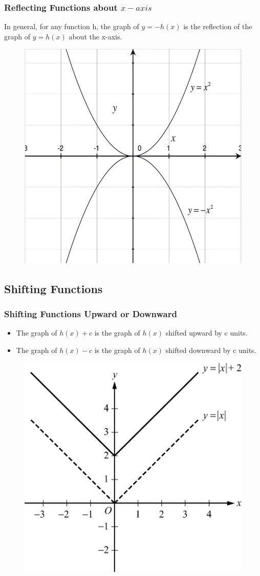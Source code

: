 \documentclass[
	11pt, %
]{beamer}
\begin{document}
\begin{frame}
	\frametitle{Reflecting Functions about $x-axis$}
	\begin{theorem}
	In general, for any function h, the graph of $y = −h(x)$ is the reflection of the graph of $y = h(x)$ about the x-axis.
	\end{theorem}
	\begin{figure}
		\includegraphics[width=0.5\linewidth]{Reflection2.jpeg} 
	\end{figure}
\end{frame}


\subsection{Shifting Functions}
\begin{frame}
	\frametitle{Shifting Functions Upward or Downward}
	\begin{theorem}
		\begin{itemize}
			\item The graph of $h(x) + c$ is the graph of $h(x)$ shifted upward by c units. 
			\item The graph of $h(x) - c$ is the graph of $h(x)$ shifted downward by c units.
		\end{itemize}
	\end{theorem}
	

	\begin{figure}
		\includegraphics[width=0.5\linewidth]{Shifting_Function1.jpg} 
	\end{figure}

\end{frame}
\end{document}
